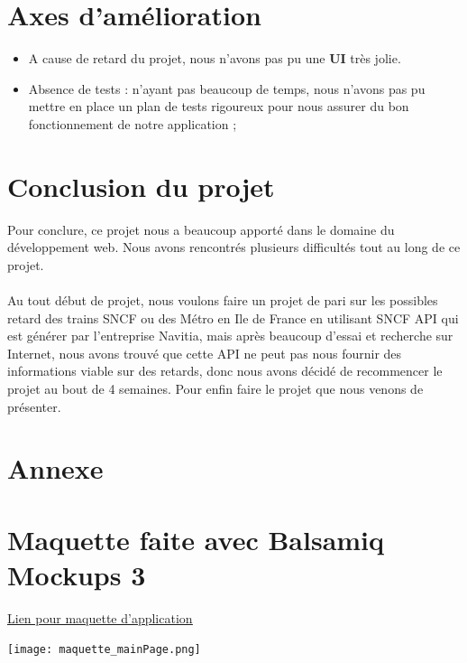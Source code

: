 \documentclass[12pt]{article}
\begin{document}
\newpage
\section{Axes d'amélioration}

\begin{itemize}
    \item 

A cause de retard du projet, nous n'avons pas pu  une \textbf{UI} très jolie. 
\\

\item
Absence de tests : n’ayant pas beaucoup de temps, nous n’avons pas pu mettre en
place un plan de tests rigoureux pour nous assurer du bon fonctionnement de notre
application ;
\end{itemize}



\section{Conclusion du projet}
 Pour conclure, ce projet nous a beaucoup apporté dans le domaine du développement web. Nous avons rencontrés plusieurs difficultés tout au long de ce projet.
\paragraph{}
Au tout début de projet, nous voulons faire un projet de pari sur les possibles retard des trains SNCF ou des Métro en Ile de France en utilisant SNCF API qui est générer par l’entreprise Navitia, mais après beaucoup d’essai et recherche sur Internet, nous avons trouvé que cette API ne peut pas nous fournir des informations viable sur des retards, donc nous avons décidé de recommencer le projet au bout de 4 semaines. Pour enfin faire le projet que nous venons de présenter.




\newpage







\newpage
\section{Annexe}
\appendix
\section{Maquette faite avec Balsamiq Mockups 3}
\label{Annexe-Maquette}
\href{https://drive.google.com/file/d/13S1_j926OpUDYI9evYTFl-aJDEXmhMbn/view?usp=sharing}{\underline{Lien pour maquette d'application}}
\begin{center}
    \texttt{[image: maquette\_mainPage.png]}
\end{center}
\end{document}
